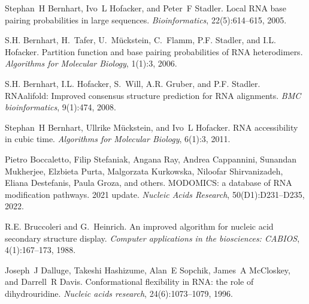 
\begin{DoxyDescription}
\item[\label{citelist_CITEREF_bernhart:2005}%
\Hypertarget{citelist_CITEREF_bernhart:2005}%
\mbox{[}1\mbox{]}]Stephan~H Bernhart, Ivo~L Hofacker, and Peter~F Stadler. Local RNA base pairing probabilities in large sequences. {\itshape Bioinformatics}, 22(5)\+:614--615, 2005.


\item[\label{citelist_CITEREF_bernhart:2006}%
\Hypertarget{citelist_CITEREF_bernhart:2006}%
\mbox{[}2\mbox{]}]S.\+H. Bernhart, H.~Tafer, U.~M\"{u}ckstein, C.~Flamm, P.\+F. Stadler, and I.\+L. Hofacker. Partition function and base pairing probabilities of RNA heterodimers. {\itshape Algorithms for Molecular Biology}, 1(1)\+:3, 2006.


\item[\label{citelist_CITEREF_bernhart:2008}%
\Hypertarget{citelist_CITEREF_bernhart:2008}%
\mbox{[}3\mbox{]}]S.\+H. Bernhart, I.\+L. Hofacker, S.~Will, A.\+R. Gruber, and P.\+F. Stadler. RNAalifold\+: Improved consensus structure prediction for RNA alignments. {\itshape BMC bioinformatics}, 9(1)\+:474, 2008.


\item[\label{citelist_CITEREF_bernhart:2011}%
\Hypertarget{citelist_CITEREF_bernhart:2011}%
\mbox{[}4\mbox{]}]Stephan~H Bernhart, Ullrike M\"{u}ckstein, and Ivo~L Hofacker. RNA accessibility in cubic time. {\itshape Algorithms for Molecular Biology}, 6(1)\+:3, 2011.


\item[\label{citelist_CITEREF_boccaletto:2022}%
\Hypertarget{citelist_CITEREF_boccaletto:2022}%
\mbox{[}5\mbox{]}]Pietro Boccaletto, Filip Stefaniak, Angana Ray, Andrea Cappannini, Sunandan Mukherjee, Elzbieta Purta, Malgorzata Kurkowska, Niloofar Shirvanizadeh, Eliana Destefanis, Paula Groza, and others. MODOMICS\+: a database of RNA modification pathways. 2021 update. {\itshape Nucleic Acids Research}, 50(D1)\+:D231--D235, 2022. 


\item[\label{citelist_CITEREF_bruccoleri:1988}%
\Hypertarget{citelist_CITEREF_bruccoleri:1988}%
\mbox{[}6\mbox{]}]R.\+E. Bruccoleri and G.~Heinrich. An improved algorithm for nucleic acid secondary structure display. {\itshape Computer applications in the biosciences\+: CABIOS}, 4(1)\+:167--173, 1988.


\item[\label{citelist_CITEREF_dalluge:1996}%
\Hypertarget{citelist_CITEREF_dalluge:1996}%
\mbox{[}7\mbox{]}]Joseph~J Dalluge, Takeshi Hashizume, Alan~E Sopchik, James~A Mc\+Closkey, and Darrell~R Davis. Conformational flexibility in RNA\+: the role of dihydrouridine. {\itshape Nucleic acids research}, 24(6)\+:1073--1079, 1996. 



\end{DoxyDescription}
